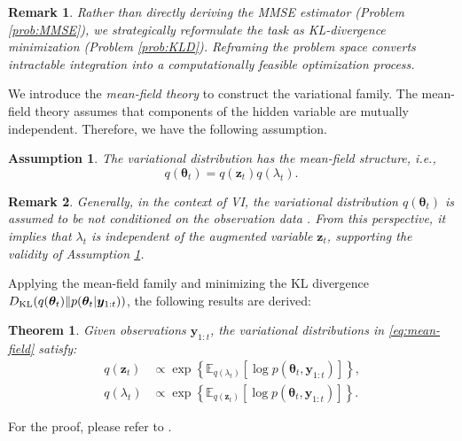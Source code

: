 \documentclass[10pt,twocolumn,twoside]{IEEEtran}
\newtheorem{theorem}{Theorem}
\newtheorem{assumption}{Assumption}
\newtheorem{remark}{Remark}
\newcommand{\e}[1]{\exp\left\{#1\right\}}
\newcommand{\E}[2][]{ \mathbb{E}_{#1}\left[#2\right] } %
\newcommand{\cm}{\text{,}} %
\newcommand{\fs}{\text{.}} %
\newcommand{\y}{{ \bm{y} }}
\newcommand{\z}{{ \bm{z} }}
\begin{document}
\begin{remark}
    Rather than directly deriving the MMSE estimator (Problem \ref{prob:MMSE}), we strategically reformulate the task as KL-divergence minimization (Problem \ref{prob:KLD}). Reframing the problem space converts intractable integration into a computationally feasible optimization process.
\end{remark}

We introduce the {\it mean-field theory}\cite{blei2017variational} to construct the variational family. The mean-field theory assumes that components of the hidden variable are mutually independent. Therefore, we have the following assumption.
\begin{assumption} \label{assump:mean-field}
The variational distribution has the mean-field structure, i.e.,
\begin{equation} \label{eq:mean-field}
    q(\bm\theta_t) = q(\z_t)q(\lambda_t) \fs
\end{equation}    
\end{assumption}

\begin{remark}    
    Generally, in the context of VI, the variational distribution $q(\bm\theta_t)$ is assumed to be not conditioned on the observation data \cite{ganguly2021introduction}. From this perspective, it implies that $\lambda_t$ is independent of the augmented variable $\z_t$, supporting the validity of Assumption \ref{assump:mean-field}.
\end{remark}

Applying the mean-field family and minimizing the KL divergence $D_{\rm KL}(q(\bm\theta_t)\Vert p(\bm\theta_t|\y_{1:t}))$, the following results are derived:
\begin{theorem} \label{thm:MFVI} %
Given observations $\y_{1:t}$, the variational distributions in \eqref{eq:mean-field} satisfy:
\begin{align*}
    q(\z_t) &\propto \e{\E[q(\lambda_t)]{\log{p(\bm\theta_t,\y_{1:t})}}}\cm \\ 
    q(\lambda_t) &\propto \e{\E[q(\z_t)]{\log{p(\bm\theta_t,\y_{1:t})}}}\fs
\end{align*}
\end{theorem}
\begin{IEEEproof}
    For the proof, please refer to \cite{blei2017variational}.
\end{IEEEproof}
\end{document}

